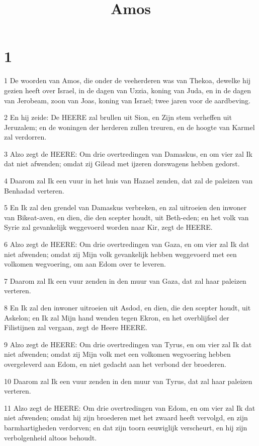 

\title{Amos}



\chapter{1}

\par 1 De woorden van Amos, die onder de veeherderen was van Thekoa, dewelke hij gezien heeft over Israel, in de dagen van Uzzia, koning van Juda, en in de dagen van Jerobeam, zoon van Joas, koning van Israel; twee jaren voor de aardbeving.
\par 2 En hij zeide: De HEERE zal brullen uit Sion, en Zijn stem verheffen uit Jeruzalem; en de woningen der herderen zullen treuren, en de hoogte van Karmel zal verdorren.
\par 3 Alzo zegt de HEERE: Om drie overtredingen van Damaskus, en om vier zal Ik dat niet afwenden; omdat zij Gilead met ijzeren dorswagens hebben gedorst.
\par 4 Daarom zal Ik een vuur in het huis van Hazael zenden, dat zal de paleizen van Benhadad verteren.
\par 5 En Ik zal den grendel van Damaskus verbreken, en zal uitroeien den inwoner van Bikeat-aven, en dien, die den scepter houdt, uit Beth-eden; en het volk van Syrie zal gevankelijk weggevoerd worden naar Kir, zegt de HEERE.
\par 6 Alzo zegt de HEERE: Om drie overtredingen van Gaza, en om vier zal Ik dat niet afwenden; omdat zij Mijn volk gevankelijk hebben weggevoerd met een volkomen wegvoering, om aan Edom over te leveren.
\par 7 Daarom zal Ik een vuur zenden in den muur van Gaza, dat zal haar paleizen verteren.
\par 8 En Ik zal den inwoner uitroeien uit Asdod, en dien, die den scepter houdt, uit Askelon; en Ik zal Mijn hand wenden tegen Ekron, en het overblijfsel der Filistijnen zal vergaan, zegt de Heere HEERE.
\par 9 Alzo zegt de HEERE: Om drie overtredingen van Tyrus, en om vier zal Ik dat niet afwenden; omdat zij Mijn volk met een volkomen wegvoering hebben overgeleverd aan Edom, en niet gedacht aan het verbond der broederen.
\par 10 Daarom zal Ik een vuur zenden in den muur van Tyrus, dat zal haar paleizen verteren.
\par 11 Alzo zegt de HEERE: Om drie overtredingen van Edom, en om vier zal Ik dat niet afwenden; omdat hij zijn broederen met het zwaard heeft vervolgd, en zijn barmhartigheden verdorven; en dat zijn toorn eeuwiglijk verscheurt, en hij zijn verbolgenheid altoos behoudt.
